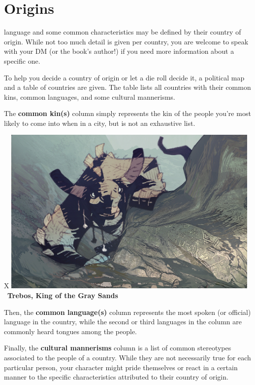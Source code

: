 \section{Origins}

language and some common characteristics may be defined by their country of origin.
While not too much detail is given per country, you are welcome to speak with your DM (or the book's author!) if you need more information about a specific one.

To help you decide a country of origin or let a die roll decide it, a political map and a table of countries are given.
The table lists all countries with their common kins, common languages, and some cultural mannerisms.

The \textbf{common kin(s)} column simply represents the kin of the people you're most likely to come into when in a city, but is not an exhaustive list.

\begin{table}[b]%
    \begin{DndTable}[width=\linewidth]{X}
        \centering
        \includegraphics[width=0.95\textwidth]{04background/img/king_of_the_gray_sands_trebos.jpg} \
        \centering \large{\textbf{Trebos, King of the Gray Sands}}
    \end{DndTable}
\end{table}

Then, the \textbf{common language(s)} column represents the most spoken (or official) language in the country, while the second or third languages in the column are commonly heard tongues among the people.

Finally, the \textbf{cultural mannerisms} column is a list of common stereotypes associated to the people of a country.
While they are not necessarily true for each particular person, your character might pride themselves or react in a certain manner to the specific characteristics attributed to their country of origin.

